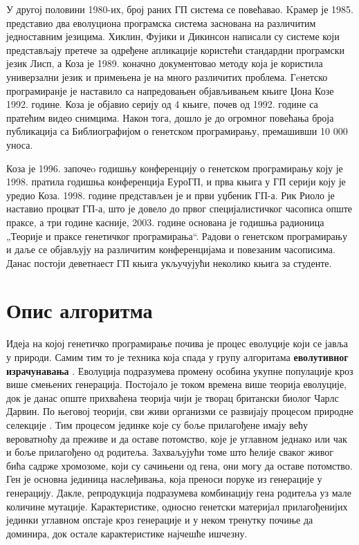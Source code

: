 \documentclass[a4paper]{article}
\begin{document}
У другој половини 1980-их, број раних ГП система се повећавао. Kрамер је 1985. представио два еволуциона програмска система заснована на различитим једноставним језицима. Хиклин, Фујики и Дикинсон написали су системе који представљају претече за одређене апликације користећи стандардни програмски језик Лисп, а Коза је 1989. коначно документовао методу која је користила универзални језик и примењена је на много различитих проблема. Гeнетско програмиранје је наставило са напредовањен објављивањем књиге Џона Козе 1992. године. Коза је објавио серију од 4 књиге, почев од 1992. године са пратећим видео снимцима. Након тога, дошло је до огромног повећања броја публикација са Библиографијом о генетском програмирању, премашивши 10 000 уноса.


Коза је 1996. започеo годишњу конференцију о генетском програмирању  коју је 1998. пратила годишња конференција ЕуроГП, и прва књига у ГП серији коју је уредио Коза. 1998. године представљен је и први уџбеник ГП-а. Рик Риоло је наставио процват ГП-а, што је довело до првог специјалистичког часописа опште праксе, а три године касније, 2003. године основана је годишња радионица „Теорије и праксе генетичког програмирања“. Радови о генетском програмирању и даље се објављују на различитим конференцијама и повезаним часописима. Данас постоји деветнаест ГП књига укључујући неколико књига за студенте.

\section{Опис алгоритма}

Идеја на којој генетичко програмирање почива је процес еволуције који се јавља у природи. Самим тим то је техника која спада у групу алгоритама  \textbf{еволутивног израчунавања} \cite{compIntelligence}. Еволуција подразумева промену особина укупне популације кроз више смењених генерација. Постојало је током времена више теорија еволуције, док је данас опште прихваћена теорија чији је творац британски биолог Чарлс Дарвин. По његовој теорији, сви живи организми се развијају процесом природне селекције \cite{darwin1859}. Тим процесом јединке које су боље прилагођене имају већу вероватноћу да преживе и да оставе потомство, које је углавном једнако или чак и боље прилагођено од родитеља. Захваљујући томе што ћелије сваког живог бића садрже хромозоме, који су сачињени од гена, они могу да оставе потомство. Ген је основна јединица наслеђивања, која преноси поруке из генерације у генерацију. Дакле, репродукција подразумева комбинацију гена родитеља уз мале количине мутације. Карактеристике, односно генетски материјал прилагођенијих јединки углавном опстаје кроз генерације и у неком тренутку почиње да доминира, док остале карактеристике најчешће ишчезну.\newline
\end{document}
